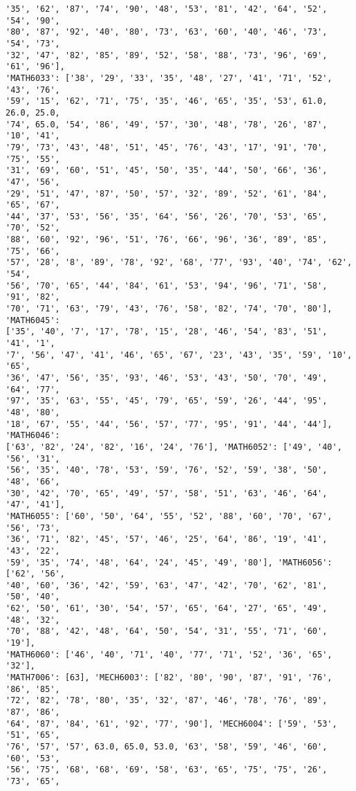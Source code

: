 \documentclass[11pt]{article}
\begin{document}
\begin{Verbatim}[commandchars=\\\{\}]
'35', '62', '87', '74', '90', '48', '53', '81', '42', '64', '52', '54', '90',
'80', '87', '92', '40', '80', '73', '63', '60', '40', '46', '73', '54', '73',
'32', '47', '82', '85', '89', '52', '58', '88', '73', '96', '69', '61', '96'],
'MATH6033': ['38', '29', '33', '35', '48', '27', '41', '71', '52', '43', '76',
'59', '15', '62', '71', '75', '35', '46', '65', '35', '53', 61.0, 26.0, 25.0,
'74', 65.0, '54', '86', '49', '57', '30', '48', '78', '26', '87', '10', '41',
'79', '73', '43', '48', '51', '45', '76', '43', '17', '91', '70', '75', '55',
'31', '69', '60', '51', '45', '50', '35', '44', '50', '66', '36', '47', '56',
'29', '51', '47', '87', '50', '57', '32', '89', '52', '61', '84', '65', '67',
'44', '37', '53', '56', '35', '64', '56', '26', '70', '53', '65', '70', '52',
'88', '60', '92', '96', '51', '76', '66', '96', '36', '89', '85', '75', '66',
'57', '28', '8', '89', '78', '92', '68', '77', '93', '40', '74', '62', '54',
'56', '70', '65', '44', '84', '61', '53', '94', '96', '71', '58', '91', '82',
'70', '71', '63', '79', '43', '76', '58', '82', '74', '70', '80'], 'MATH6045':
['35', '40', '7', '17', '78', '15', '28', '46', '54', '83', '51', '41', '1',
'7', '56', '47', '41', '46', '65', '67', '23', '43', '35', '59', '10', '65',
'36', '47', '56', '35', '93', '46', '53', '43', '50', '70', '49', '64', '77',
'97', '35', '63', '55', '45', '79', '65', '59', '26', '44', '95', '48', '80',
'18', '67', '55', '44', '56', '57', '77', '95', '91', '44', '44'], 'MATH6046':
['63', '82', '24', '82', '16', '24', '76'], 'MATH6052': ['49', '40', '56', '31',
'56', '35', '40', '78', '53', '59', '76', '52', '59', '38', '50', '48', '66',
'30', '42', '70', '65', '49', '57', '58', '51', '63', '46', '64', '47', '41'],
'MATH6055': ['60', '50', '64', '55', '52', '88', '60', '70', '67', '56', '73',
'36', '71', '82', '45', '57', '46', '25', '64', '86', '19', '41', '43', '22',
'59', '35', '74', '48', '64', '24', '45', '49', '80'], 'MATH6056': ['62', '56',
'40', '60', '36', '42', '59', '63', '47', '42', '70', '62', '81', '50', '40',
'62', '50', '61', '30', '54', '57', '65', '64', '27', '65', '49', '48', '32',
'70', '88', '42', '48', '64', '50', '54', '31', '55', '71', '60', '19'],
'MATH6060': ['46', '40', '71', '40', '77', '71', '52', '36', '65', '32'],
'MATH7006': [63], 'MECH6003': ['82', '80', '90', '87', '91', '76', '86', '85',
'72', '82', '78', '80', '35', '32', '87', '46', '78', '76', '89', '87', '86',
'64', '87', '84', '61', '92', '77', '90'], 'MECH6004': ['59', '53', '51', '65',
'76', '57', '57', 63.0, 65.0, 53.0, '63', '58', '59', '46', '60', '60', '53',
'56', '75', '68', '68', '69', '58', '63', '65', '75', '75', '26', '73', '65',

\end{Verbatim}
\end{document}
